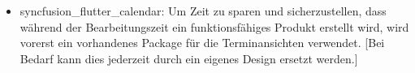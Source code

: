 \begin{itemize}
	\item syncfusion\_flutter\_calendar\cite{tech_packageCalendar}: Um Zeit zu sparen und sicherzustellen, dass während der Bearbeitungszeit ein funktionsfähiges Produkt erstellt wird, wird vorerst ein vorhandenes Package für die Terminansichten verwendet. [Bei Bedarf kann dies jederzeit durch ein eigenes Design ersetzt werden.]  
\end{itemize}
